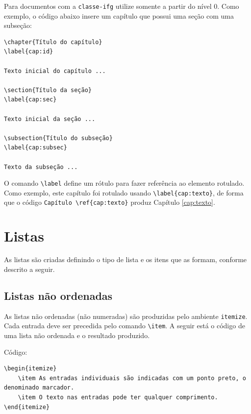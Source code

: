 Para documentos com a \texttt{classe-ifg} utilize somente a partir do nível 0. Como exemplo, o código abaixo insere um capítulo que possui uma seção com uma subseção:

\begin{verbatim}
\chapter{Título do capítulo}
\label{cap:id}

Texto inicial do capítulo ...

\section{Título da seção}
\label{cap:sec}

Texto inicial da seção ...

\subsection{Título do subseção}
\label{cap:subsec}

Texto da subseção ...
\end{verbatim}

O comando \verb|\label| define um rótulo para fazer referência ao elemento rotulado. Como exemplo, este capítulo foi rotulado usando \verb|\label{cap:texto}|, de forma que o código \verb|Capítulo \ref{cap:texto}| produz Capítulo \ref{cap:texto}.

\section{Listas}
\label{sec:listas} 

As listas são criadas definindo o tipo de lista e os itens que as formam, conforme descrito a seguir.

\subsection{Listas não ordenadas}

As listas não ordenadas (não numeradas) são produzidas pelo ambiente \verb|itemize|. Cada entrada deve ser precedida pelo comando \verb|\item|. A seguir está o código de uma lista não ordenada e o resultado produzido.

Código:

\begin{verbatim}
\begin{itemize}
    \item As entradas individuais são indicadas com um ponto preto, o 
denominado marcador.
    \item O texto nas entradas pode ter qualquer comprimento.
\end{itemize}
\end{verbatim}

